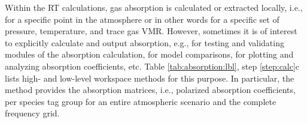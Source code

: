 Within the RT calculations, gas absorption is calculated or extracted locally,
i.e., for a specific point in the atmosphere or in other words for a specific
set of pressure, temperature, and trace gas VMR. However, sometimes it is of
interest to explicitly calculate and output absorption, e.g., for testing and
validating modules of the absorption calculation,  for model comparisons, for
plotting and analyzing absorption coefficients, etc.
Table \ref{tab:absorption:lbl}, step \ref{step:calc}c lists high- and low-level
workspace methods for this purpose.
In particular, the method  provides the
absorption matrices, i.e., polarized absorption coefficients, per species tag
group for an entire atmospheric scenario and the complete frequency grid.


